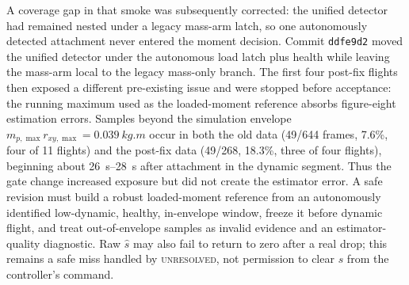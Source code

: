A coverage gap in that smoke was subsequently corrected: the unified detector had remained
nested under a legacy mass-arm latch, so one autonomously detected attachment never entered the
moment decision. Commit \texttt{ddfe9d2} moved the unified detector under the autonomous load
latch plus health while leaving the mass-arm local to the legacy mass-only branch. The first four
post-fix flights then exposed a different pre-existing issue and were stopped before acceptance:
the running maximum used as the loaded-moment reference absorbs figure-eight estimation errors.
Samples beyond the simulation envelope $m_{p,\max}r_{xy,\max}=\SI{0.039}{kg.m}$ occur in both the
old data (49/644 frames, 7.6\%, four of 11 flights) and the post-fix data (49/268, 18.3\%, three of four
flights), beginning about \SIrange{26}{28}{s} after attachment in the dynamic segment. Thus the
gate change increased exposure but did not create the estimator error. A safe revision must build
a robust loaded-moment reference from an autonomously identified low-dynamic, healthy,
in-envelope window, freeze it before dynamic flight, and treat out-of-envelope samples as invalid
evidence and an estimator-quality diagnostic. Raw $\hat s$ may also fail to return to zero after a
real drop; this remains a safe miss handled by \textsc{unresolved}, not permission to clear $s$
from the controller's command.
\fi
